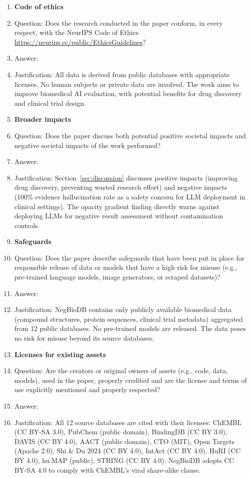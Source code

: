 \begin{enumerate}
\item {\bf Code of ethics}
    \item[] Question: Does the research conducted in the paper conform, in every respect, with the NeurIPS Code of Ethics \url{https://neurips.cc/public/EthicsGuidelines}?
    \item[] Answer: \answerYes{}
    \item[] Justification: All data is derived from public databases with appropriate licenses. No human subjects or private data are involved. The work aims to improve biomedical AI evaluation, with potential benefits for drug discovery and clinical trial design.

\item {\bf Broader impacts}
    \item[] Question: Does the paper discuss both potential positive societal impacts and negative societal impacts of the work performed?
    \item[] Answer: \answerYes{}
    \item[] Justification: Section~\ref{sec:discussion} discusses positive impacts (improving drug discovery, preventing wasted research effort) and negative impacts (100\% evidence hallucination rate as a safety concern for LLM deployment in clinical settings). The opacity gradient finding directly warns against deploying LLMs for negative result assessment without contamination controls.

\item {\bf Safeguards}
    \item[] Question: Does the paper describe safeguards that have been put in place for responsible release of data or models that have a high risk for misuse (e.g., pre-trained language models, image generators, or scraped datasets)?
    \item[] Answer: \answerNA{}
    \item[] Justification: NegBioDB contains only publicly available biomedical data (compound structures, protein sequences, clinical trial metadata) aggregated from 12 public databases. No pre-trained models are released. The data poses no risk for misuse beyond its source databases.

\item {\bf Licenses for existing assets}
    \item[] Question: Are the creators or original owners of assets (e.g., code, data, models), used in the paper, properly credited and are the license and terms of use explicitly mentioned and properly respected?
    \item[] Answer: \answerYes{}
    \item[] Justification: All 12 source databases are cited with their licenses: ChEMBL (CC BY-SA 3.0), PubChem (public domain), BindingDB (CC BY 3.0), DAVIS (CC BY 4.0), AACT (public domain), CTO (MIT), Open Targets (Apache 2.0), Shi \& Du 2024 (CC BY 4.0), IntAct (CC BY 4.0), HuRI (CC BY 4.0), hu.MAP (public), STRING (CC BY 4.0). NegBioDB adopts CC BY-SA 4.0 to comply with ChEMBL's viral share-alike clause.


\end{enumerate}
